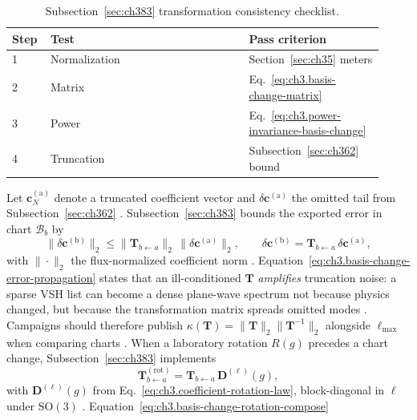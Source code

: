 \begin{table}[t]
\centering
\caption{Subsection~\ref{sec:ch383} transformation consistency checklist.}
\label{tab:ch3.383-audit-checklist}
\small
\begin{tabular}{@{}p{0.08\linewidth}p{0.50\linewidth}p{0.34\linewidth}@{}}
\toprule
Step & Test & Pass criterion \\
\midrule
1 & Normalization & Section~\ref{sec:ch35} meters \\
2 & Matrix & Eq.~\eqref{eq:ch3.basis-change-matrix} \\
3 & Power & Eq.~\eqref{eq:ch3.power-invariance-basis-change} \\
4 & Truncation & Subsection~\ref{sec:ch362} bound \\
\bottomrule
\end{tabular}
\end{table}
Let \(\mathbf{c}^{(\mathrm{a})}_{N}\) denote a truncated coefficient vector and \(\delta\mathbf{c}^{(\mathrm{a})}\) the omitted tail from
Subsection~\ref{sec:ch362} \cite{harrington2001}. Subsection~\ref{sec:ch383} bounds the exported error in chart \(\mathcal{B}_{b}\) by
\begin{equation}
\label{eq:ch3.basis-change-error-propagation}
\|\delta\mathbf{c}^{(\mathrm{b})}\|_{2}
\le
\|\mathbf{T}_{b\leftarrow a}\|_{2}\,
\|\delta\mathbf{c}^{(\mathrm{a})}\|_{2},
\qquad
\delta\mathbf{c}^{(\mathrm{b})}=\mathbf{T}_{b\leftarrow a}\,\delta\mathbf{c}^{(\mathrm{a})},
\end{equation}
with \(\|\cdot\|_{2}\) the flux-normalized coefficient norm \cite{hansen1988}. Equation~\eqref{eq:ch3.basis-change-error-propagation}
states that an ill-conditioned \(\mathbf{T}\) \emph{amplifies} truncation noise: a sparse VSH list can become a dense plane-wave spectrum not because
physics changed, but because the transformation matrix spreads omitted modes \cite{jackson1999}. Campaigns should therefore publish
\(\kappa(\mathbf{T})=\|\mathbf{T}\|_{2}\|\mathbf{T}^{-1}\|_{2}\) alongside \(\ell_{\max}\) when comparing charts \cite{stratton1941}.
When a laboratory rotation \(R(g)\) precedes a chart change, Subsection~\ref{sec:ch383} implements
\begin{equation}
\label{eq:ch3.basis-change-rotation-compose}
\mathbf{T}_{b\leftarrow a}^{\mathrm{(rot)}}
=
\mathbf{T}_{b\leftarrow a}\,
\mathbf{D}^{(\ell)}(g),
\end{equation}
with \(\mathbf{D}^{(\ell)}(g)\) from Eq.~\eqref{eq:ch3.coefficient-rotation-law}, block-diagonal in \(\ell\) under \(\mathrm{SO}(3)\)
\cite{jackson1999}. Equation~\eqref{eq:ch3.basis-change-rotation-compose}
